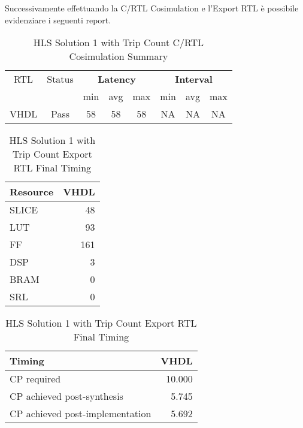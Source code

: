 Successivamente effettuando la C/RTL Cosimulation e l'Export RTL è possibile evidenziare i seguenti report.
\begin{table}[H]
	\centering
	\begin{tabular}{|c|c|c|c|c|c|c|c|}
		\hline
		\multicolumn{1}{|c|}{RTL} & \multicolumn{1}{|c|}{Status} & \multicolumn{3}{c|}{\textbf{Latency}} & \multicolumn{3}{c|}{\textbf{Interval}} \\
		&  & min & avg & max & min & avg & max \\
		\hline
		VHDL & Pass & 58 & 58 & 58 & NA & NA & NA \\
		\hline
	\end{tabular}
	\caption{HLS Solution 1 with Trip Count C/RTL Cosimulation Summary }
	\label{tab:hls-solution-1-cosimulation-summary}
\end{table}

\begin{table}[H]
	\centering
	\begin{minipage}[t]{0.45\linewidth}
		\centering
		\begin{tabular}{|l|r|}
			\hline
			\textbf{Resource} & \textbf{VHDL} \\
			\hline
			SLICE & 48 \\
			\hline
			LUT & 93 \\
			\hline
			FF & 161 \\
			\hline
			DSP & 3 \\
			\hline
			BRAM & 0 \\
			\hline
			SRL & 0 \\
			\hline
		\end{tabular}
		\caption{HLS Solution 1 with Trip Count Export RTL Resource Usage}
		\label{tab:hls-solution-1-export-rtl-resoruce-usage}
	\end{minipage}
	\hfill
	\begin{minipage}[t]{0.45\linewidth}
		\centering
		\begin{tabular}{|l|r|}
			\hline
			\textbf{Timing} & \textbf{VHDL} \\
			\hline
			CP required & 10.000 \\
			\hline
			CP achieved post-synthesis & 5.745 \\
			\hline
			CP achieved post-implementation & 5.692 \\
			\hline
		\end{tabular}
		\caption{HLS Solution 1 with Trip Count Export RTL Final Timing}
		\label{tab:hls-solution-1-export-rtl-final-timing}
	\end{minipage}
\end{table}